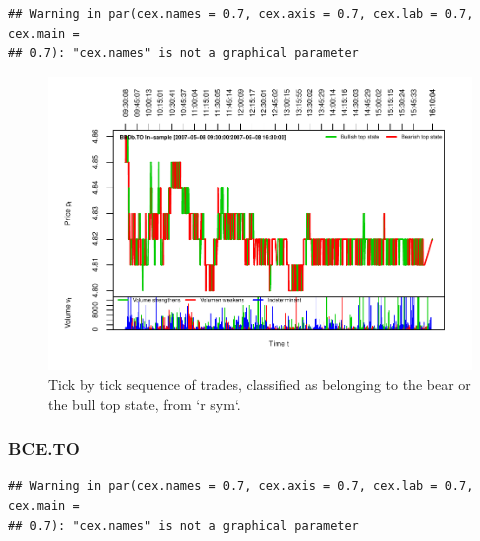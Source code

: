\documentclass[]{article}
\begin{document}
\begin{verbatim}
## Warning in par(cex.names = 0.7, cex.axis = 0.7, cex.lab = 0.7, cex.main =
## 0.7): "cex.names" is not a graphical parameter
\end{verbatim}

\begin{figure}[H]
\includegraphics[width=\textwidth]{main_files/figure-latex/unnamed-chunk-26-1} \caption{Tick by tick sequence of trades, classified as belonging to the bear or the bull top state, from `r sym`.}\label{fig:unnamed-chunk-26}
\end{figure}

\newpage

\subsubsection{BCE.TO}\label{bce.to}

\begin{verbatim}
## Warning in par(cex.names = 0.7, cex.axis = 0.7, cex.lab = 0.7, cex.main =
## 0.7): "cex.names" is not a graphical parameter
\end{verbatim}
\end{document}
